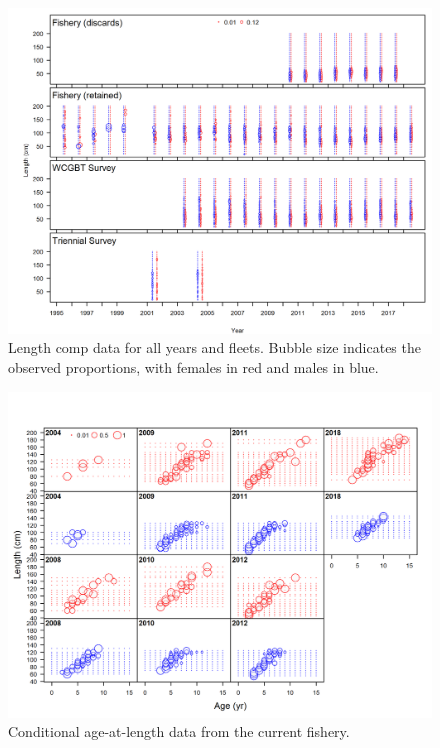 \documentclass[12pt,]{article}
\begin{document}
\begin{figure}
\centering
\includegraphics{r4ss/plots_mod1/comp_lendat__multi-fleet_comparison.png}
\caption{Length comp data for all years and fleets. Bubble size
indicates the observed proportions, with females in red and males in
blue. \label{fig:comp_lendat__multi-fleet_comparison}}
\end{figure}

\begin{figure}
\centering
\includegraphics{r4ss/plots_mod1/comp_condAALdat_bubflt1mkt2.png}
\caption{Conditional age-at-length data from the current fishery.
\label{fig:age_dat_fishery}}
\end{figure}
\end{document}
